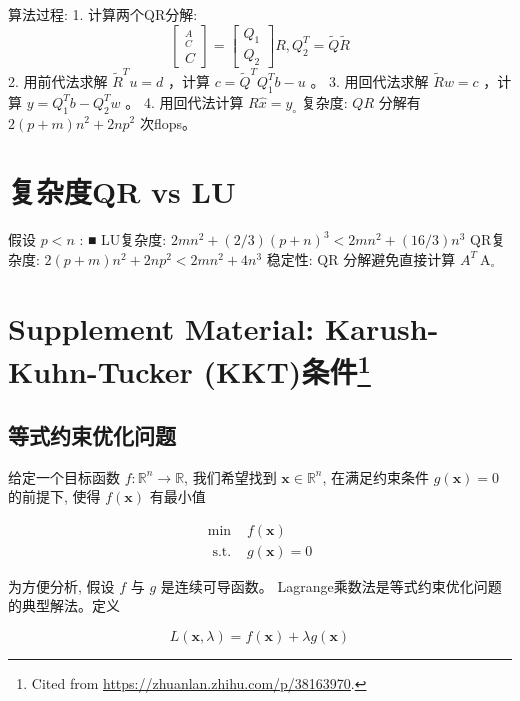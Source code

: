 算法过程:
1. 计算两个QR分解:
$$
\left[\begin{array}{l}
{ }_{C}^{A} \\
C
\end{array}\right]=\left[\begin{array}{l}
Q_{1} \\
Q_{2}
\end{array}\right] R, Q_{2}^{T}=\tilde{Q} \tilde{R}
$$
2. 用前代法求解 $ \tilde{R}^{T} u=d $ ，计算 $ c=\tilde{Q}^{T} Q_{1}^{T} b-u $ 。
3. 用回代法求解 $ \tilde{R} w=c $ ，计算 $ y=Q_{1}^{T} b-Q_{2}^{T} w $ 。
4. 用回代法计算 $ R \hat{x}=y_{\circ} $
复杂度: $ Q R $ 分解有 $ 2(p+m) n^{2}+2 n p^{2} $ 次flops。

\section{复杂度QR vs LU}

假设 $ p<n $ :
■ LU复杂度: $ 2 m n^{2}+(2 / 3)(p+n)^{3}<2 m n^{2}+(16 / 3) n^{3} $
QR复杂度: $ 2(p+m) n^{2}+2 n p^{2}<2 m n^{2}+4 n^{3} $
稳定性: $ \mathrm{QR} $ 分解避免直接计算 $ A^{T} \mathrm{~A}_{\circ} $

\section[Supplement Material: Karush-Kuhn-Tucker (KKT)条件]{Supplement Material: Karush-Kuhn-Tucker (KKT)条件\footnote{Cited from \url{https://zhuanlan.zhihu.com/p/38163970}.}}

\subsection{等式约束优化问题}

\begin{problem}[等式约束优化问题]
    给定一个目标函数 $ f: \mathbb{R}^{n} \rightarrow \mathbb{R} $, 我们希望找到 $ \mathbf{x} \in \mathbb{R}^{n} $, 在满足约束条件 $ g(\mathbf{x})=0 $ 的前提下, 使得 $ f(\mathbf{x}) $ 有最小值

    $$
\begin{array}{ll}
\min & f(\mathbf{x}) \\
\text { s.t. } & g(\mathbf{x})=0
\end{array}
$$
\end{problem}

为方便分析, 假设 $ f $ 与 $ g $ 是连续可导函数。 Lagrange乘数法是等式约束优化问题的典型解法。定义

\begin{definition}[Lagrangian函数]
    $$
L(\mathbf{x}, \lambda)=f(\mathbf{x})+\lambda g(\mathbf{x})
$$
\end{definition}

